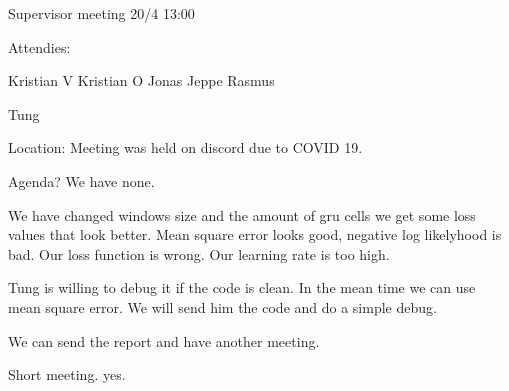 Supervisor meeting 20/4 13:00

Attendies:

Kristian V
Kristian O
Jonas
Jeppe
Rasmus

Tung

Location: Meeting was held on discord due to COVID 19.

Agenda? We have none. 

We have changed windows size and the amount of gru cells we get some loss values that look better. 
Mean square error looks good, negative log likelyhood is bad.
Our loss function is wrong. Our learning rate is too high.

Tung is willing to debug it if the code is clean. In the mean time we can use mean square error.
We will send him the code and do a simple debug.

We can send the report and have another meeting.

Short meeting.  yes.
